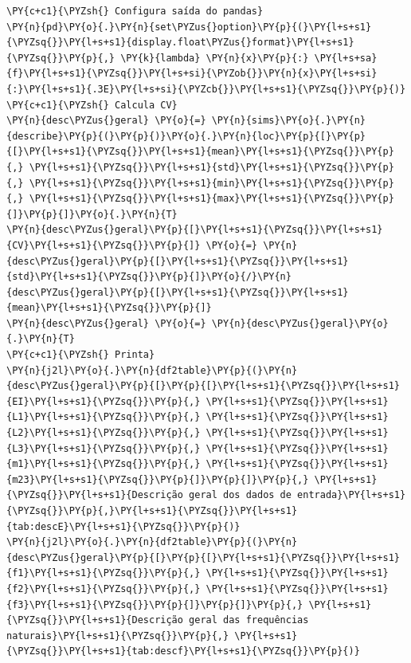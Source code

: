     \begin{tcolorbox}[breakable, size=fbox, boxrule=1pt, pad at break*=1mm,colback=cellbackground, colframe=cellborder]
\begin{Verbatim}[commandchars=\\\{\}]
\PY{c+c1}{\PYZsh{} Configura saída do pandas}
\PY{n}{pd}\PY{o}{.}\PY{n}{set\PYZus{}option}\PY{p}{(}\PY{l+s+s1}{\PYZsq{}}\PY{l+s+s1}{display.float\PYZus{}format}\PY{l+s+s1}{\PYZsq{}}\PY{p}{,} \PY{k}{lambda} \PY{n}{x}\PY{p}{:} \PY{l+s+sa}{f}\PY{l+s+s1}{\PYZsq{}}\PY{l+s+si}{\PYZob{}}\PY{n}{x}\PY{l+s+si}{:}\PY{l+s+s1}{.3E}\PY{l+s+si}{\PYZcb{}}\PY{l+s+s1}{\PYZsq{}}\PY{p}{)}
\PY{c+c1}{\PYZsh{} Calcula CV}
\PY{n}{desc\PYZus{}geral} \PY{o}{=} \PY{n}{sims}\PY{o}{.}\PY{n}{describe}\PY{p}{(}\PY{p}{)}\PY{o}{.}\PY{n}{loc}\PY{p}{[}\PY{p}{[}\PY{l+s+s1}{\PYZsq{}}\PY{l+s+s1}{mean}\PY{l+s+s1}{\PYZsq{}}\PY{p}{,} \PY{l+s+s1}{\PYZsq{}}\PY{l+s+s1}{std}\PY{l+s+s1}{\PYZsq{}}\PY{p}{,} \PY{l+s+s1}{\PYZsq{}}\PY{l+s+s1}{min}\PY{l+s+s1}{\PYZsq{}}\PY{p}{,} \PY{l+s+s1}{\PYZsq{}}\PY{l+s+s1}{max}\PY{l+s+s1}{\PYZsq{}}\PY{p}{]}\PY{p}{]}\PY{o}{.}\PY{n}{T}
\PY{n}{desc\PYZus{}geral}\PY{p}{[}\PY{l+s+s1}{\PYZsq{}}\PY{l+s+s1}{CV}\PY{l+s+s1}{\PYZsq{}}\PY{p}{]} \PY{o}{=} \PY{n}{desc\PYZus{}geral}\PY{p}{[}\PY{l+s+s1}{\PYZsq{}}\PY{l+s+s1}{std}\PY{l+s+s1}{\PYZsq{}}\PY{p}{]}\PY{o}{/}\PY{n}{desc\PYZus{}geral}\PY{p}{[}\PY{l+s+s1}{\PYZsq{}}\PY{l+s+s1}{mean}\PY{l+s+s1}{\PYZsq{}}\PY{p}{]}
\PY{n}{desc\PYZus{}geral} \PY{o}{=} \PY{n}{desc\PYZus{}geral}\PY{o}{.}\PY{n}{T}
\PY{c+c1}{\PYZsh{} Printa}
\PY{n}{j2l}\PY{o}{.}\PY{n}{df2table}\PY{p}{(}\PY{n}{desc\PYZus{}geral}\PY{p}{[}\PY{p}{[}\PY{l+s+s1}{\PYZsq{}}\PY{l+s+s1}{EI}\PY{l+s+s1}{\PYZsq{}}\PY{p}{,} \PY{l+s+s1}{\PYZsq{}}\PY{l+s+s1}{L1}\PY{l+s+s1}{\PYZsq{}}\PY{p}{,} \PY{l+s+s1}{\PYZsq{}}\PY{l+s+s1}{L2}\PY{l+s+s1}{\PYZsq{}}\PY{p}{,} \PY{l+s+s1}{\PYZsq{}}\PY{l+s+s1}{L3}\PY{l+s+s1}{\PYZsq{}}\PY{p}{,} \PY{l+s+s1}{\PYZsq{}}\PY{l+s+s1}{m1}\PY{l+s+s1}{\PYZsq{}}\PY{p}{,} \PY{l+s+s1}{\PYZsq{}}\PY{l+s+s1}{m23}\PY{l+s+s1}{\PYZsq{}}\PY{p}{]}\PY{p}{]}\PY{p}{,} \PY{l+s+s1}{\PYZsq{}}\PY{l+s+s1}{Descrição geral dos dados de entrada}\PY{l+s+s1}{\PYZsq{}}\PY{p}{,}\PY{l+s+s1}{\PYZsq{}}\PY{l+s+s1}{tab:descE}\PY{l+s+s1}{\PYZsq{}}\PY{p}{)}
\PY{n}{j2l}\PY{o}{.}\PY{n}{df2table}\PY{p}{(}\PY{n}{desc\PYZus{}geral}\PY{p}{[}\PY{p}{[}\PY{l+s+s1}{\PYZsq{}}\PY{l+s+s1}{f1}\PY{l+s+s1}{\PYZsq{}}\PY{p}{,} \PY{l+s+s1}{\PYZsq{}}\PY{l+s+s1}{f2}\PY{l+s+s1}{\PYZsq{}}\PY{p}{,} \PY{l+s+s1}{\PYZsq{}}\PY{l+s+s1}{f3}\PY{l+s+s1}{\PYZsq{}}\PY{p}{]}\PY{p}{]}\PY{p}{,} \PY{l+s+s1}{\PYZsq{}}\PY{l+s+s1}{Descrição geral das frequências naturais}\PY{l+s+s1}{\PYZsq{}}\PY{p}{,} \PY{l+s+s1}{\PYZsq{}}\PY{l+s+s1}{tab:descf}\PY{l+s+s1}{\PYZsq{}}\PY{p}{)}
\end{Verbatim}
\end{tcolorbox}

